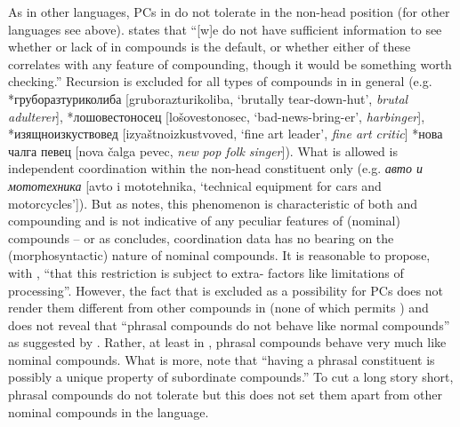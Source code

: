 \documentclass[output=paper]{LSP/langsci}
\begin{document}
As in other languages, PCs in  do not tolerate  in the non-head position (for other languages see above). \citet[350]{Bauer2009} states that “[w]e do not have sufficient information to see whether  or lack of  in compounds is the default, or whether either of these correlates with any feature of compounding, though it would be something worth checking.”  Recursion is excluded for all types of compounds in  in general (e.g. *{груборазтуриколиба} [gruborazturikoliba, ‘brutally tear-down-hut’, \textit{brutal} \textit{adulterer}], *{лошовестоносец} [lošovestonosec, ‘bad-news-bring-er’, \textit{harbing\-er}], *{изящноизкуствовед [izya}štnoizkustvoved, ‘fine art leader’, \textit{fine art critic}] *{нова чалга певец} [nova čalga pevec, \textit{new} \textit{pop folk singer}]). What is allowed is independent coordination within the non-head constituent only (e.g. \textit{{авто и мототех\-ника}} [avto i mototehnika, ‘technical equipment for cars and motorcycles’]). But as \citet[84]{Plag2003} notes, this phenomenon is characteristic of both  and compounding and is not indicative of any peculiar features of (nominal) compounds -- or as \citet[157]{Bell2011} concludes, coordination data has no bearing on the (morphosyntactic) nature of nominal compounds. It is reasonable to propose, with \citet[286]{Trips2016}, “that this restriction is subject to extra- factors like limitations of processing”. However, the fact that  is excluded as a possibility for PCs does not render them different from other compounds in  (none of which permits ) and does not reveal that “phrasal compounds do not behave like normal compounds” as suggested by \citet{Trips2016}. Rather, at least in , phrasal compounds behave very much like  nominal compounds. What is more,  \citet[11]{Arcodia2009} note that “having a phrasal constituent is possibly a unique property of subordinate compounds.”  To cut a long story short, phrasal compounds do not tolerate  but this does not set them apart from other nominal compounds in the language.
\end{document}
